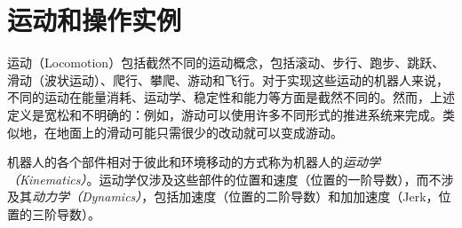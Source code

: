 \section{运动和操作实例}


运动（Locomotion）包括截然不同的运动概念，包括滚动、步行、跑步、跳跃、滑动（波状运动）、爬行、攀爬、游动和飞行。对于实现这些运动的机器人来说，不同的运动在能量消耗、运动学、稳定性和能力等方面是截然不同的。然而，上述定义是宽松和不明确的：例如，游动可以使用许多不同形式的推进系统来完成。类似地，在地面上的滑动可能只需很少的改动就可以变成游动。


机器人的各个部件相对于彼此和环境移动的方式称为机器人的\emph{运动学（Kinematics）}。运动学仅涉及这些部件的位置和速度（位置的一阶导数），而不涉及其\emph{动力学（Dynamics）}，包括加速度（位置的二阶导数）和加加速度（Jerk，位置的三阶导数）。


